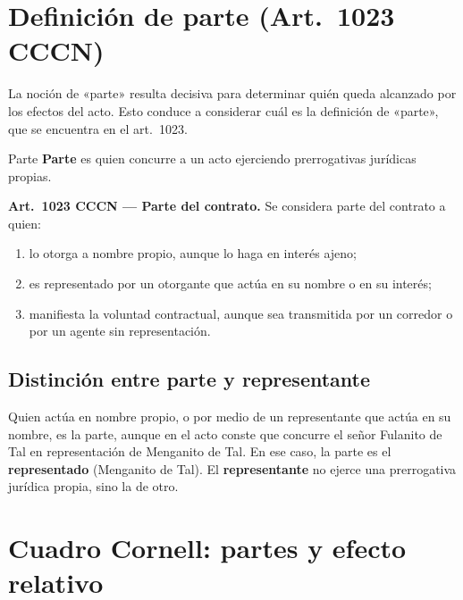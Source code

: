 \documentclass[12pt,oneside]{book}
\begin{document}
\section{Definición de parte (Art.~1023 CCCN)}

La noción de «parte» resulta decisiva para determinar quién queda alcanzado por los efectos del acto. Esto conduce a considerar cuál es la definición de «parte», que se encuentra en el art.~1023.

\begin{definition}{Parte}
\textbf{Parte} es quien concurre a un acto ejerciendo prerrogativas jurídicas propias.

\smallskip
\textbf{Art.~1023 CCCN --- Parte del contrato.} Se considera parte del contrato a quien:
\begin{enumerate}[label=\alph*)]
    \item lo otorga a nombre propio, aunque lo haga en interés ajeno;
    \item es representado por un otorgante que actúa en su nombre o en su interés;
    \item manifiesta la voluntad contractual, aunque sea transmitida por un corredor o por un agente sin representación.
\end{enumerate}
\end{definition}

\subsection{Distinción entre parte y representante}

Quien actúa en nombre propio, o por medio de un representante que actúa en su nombre, es la parte, aunque en el acto conste que concurre el señor Fulanito de Tal en representación de Menganito de Tal. En ese caso, la parte es el \textbf{representado} (Menganito de Tal). El \textbf{representante} no ejerce una prerrogativa jurídica propia, sino la de otro.

\section{Cuadro Cornell: partes y efecto relativo}
\end{document}
